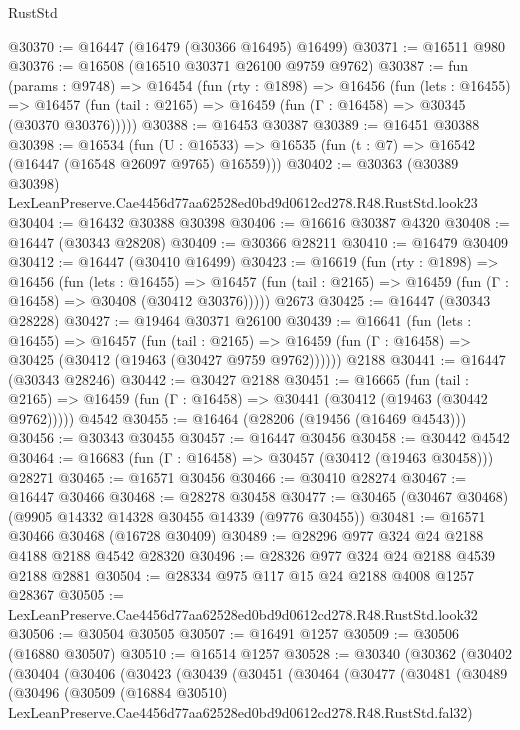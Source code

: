 \begin{lexlean}{RustStd}
\begin{coremodule}
@30370 := @16447 (@16479 (@30366 @16495) @16499)
@30371 := @16511 @980
@30376 := @16508 (@16510 @30371 @26100 @9759 @9762)
@30387 := fun (params : @9748) =>
  @16454
    (fun (rty : @1898) =>
    @16456
      (fun (lets : @16455) =>
      @16457 (fun (tail : @2165) => @16459 (fun (Γ : @16458) => @30345 (@30370 @30376)))))
@30388 := @16453 @30387
@30389 := @16451 @30388
@30398 := @16534
    (fun (U : @16533) => @16535 (fun (t : @7) => @16542 (@16447 (@16548 @26097 @9765) @16559)))
@30402 := @30363
    (@30389 @30398)
    LexLeanPreserve.Cae4456d77aa62528ed0bd9d0612cd278.R48.RustStd.look23
@30404 := @16432 @30388 @30398
@30406 := @16616 @30387 @4320
@30408 := @16447 (@30343 @28208)
@30409 := @30366 @28211
@30410 := @16479 @30409
@30412 := @16447 (@30410 @16499)
@30423 := @16619
    (fun (rty : @1898) =>
    @16456
      (fun (lets : @16455) =>
      @16457 (fun (tail : @2165) => @16459 (fun (Γ : @16458) => @30408 (@30412 @30376)))))
    @2673
@30425 := @16447 (@30343 @28228)
@30427 := @19464 @30371 @26100
@30439 := @16641
    (fun (lets : @16455) =>
    @16457
      (fun (tail : @2165) =>
      @16459 (fun (Γ : @16458) => @30425 (@30412 (@19463 (@30427 @9759 @9762))))))
    @2188
@30441 := @16447 (@30343 @28246)
@30442 := @30427 @2188
@30451 := @16665
    (fun (tail : @2165) => @16459 (fun (Γ : @16458) => @30441 (@30412 (@19463 (@30442 @9762)))))
    @4542
@30455 := @16464 (@28206 (@19456 (@16469 @4543)))
@30456 := @30343 @30455
@30457 := @16447 @30456
@30458 := @30442 @4542
@30464 := @16683 (fun (Γ : @16458) => @30457 (@30412 (@19463 @30458))) @28271
@30465 := @16571 @30456
@30466 := @30410 @28274
@30467 := @16447 @30466
@30468 := @28278 @30458
@30477 := @30465 (@30467 @30468) (@9905 @14332 @14328 @30455 @14339 (@9776 @30455))
@30481 := @16571 @30466 @30468 (@16728 @30409)
@30489 := @28296 @977 @324 @24 @2188 @4188 @2188 @4542 @28320
@30496 := @28326 @977 @324 @24 @2188 @4539 @2188 @2881
@30504 := @28334 @975 @117 @15 @24 @2188 @4008 @1257 @28367
@30505 := LexLeanPreserve.Cae4456d77aa62528ed0bd9d0612cd278.R48.RustStd.look32
@30506 := @30504 @30505
@30507 := @16491 @1257
@30509 := @30506 (@16880 @30507)
@30510 := @16514 @1257
@30528 := @30340
    (@30362
      (@30402
        (@30404
          (@30406
            (@30423
              (@30439
                (@30451
                  (@30464
                    (@30477
                      (@30481
                        (@30489
                          (@30496
                            (@30509
                              (@16884 @30510)
                              LexLeanPreserve.Cae4456d77aa62528ed0bd9d0612cd278.R48.RustStd.fal32)

\end{coremodule}
\end{lexlean}

